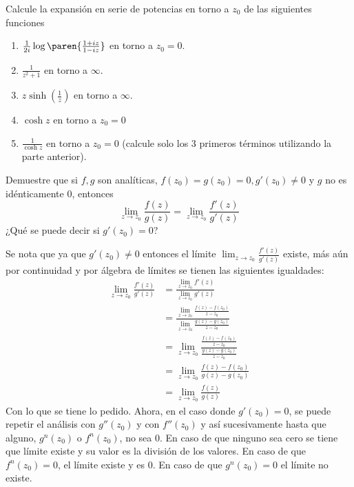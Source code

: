 \documentclass{homework}
\begin{document}
\begin{prob}
    Calcule la expansión en serie de potencias en torno a \(z_0\) de las siguientes funciones
    \begin{enumerate}
        \item \(\frac1{2i}\log\paren{\frac{1+iz}{1-iz}}\) en torno a \(z_0=0\).
        \item \(\frac1{z^2+1}\) en torno a \(\infty\).
        \item \(z\sinh(\frac1z)\) en torno a \(\infty\).
        \item \(\cosh z\) en torno a \(z_0=0\)
        \item \(\frac1{\cosh z}\) en torno a \(z_0=0\) (calcule solo los 3 primeros términos utilizando la parte anterior).
    \end{enumerate}
\end{prob}

\begin{sol}
    
\end{sol}

\begin{prob}
    Demuestre que si \(f,g\) son analíticas, \(f(z_0)=g(z_0)=0, g'(z_0)\neq0\) y \(g\) no es idénticamente 0, entonces
    \begin{equation*}
        \lim_{z\rightarrow z_0}\frac{f(z)}{g(z)}=\lim_{z\rightarrow z_0}\frac{f'(z)}{g'(z)}
    \end{equation*}
    ¿Qué se puede decir si \(g'(z_0)=0\)?
\end{prob}

\begin{sol}
    Se nota que ya que \(g'(z_0)\neq0\) entonces el límite \(\lim_{z\rightarrow z_0}\frac{f'(z)}{g'(z)}\) existe, más aún por continuidad y por álgebra de límites se tienen las siguientes igualdades:
    \begin{align*}
        \lim_{z\rightarrow z_0}\frac{f'(z)}{g'(z)}&=\frac{\lim_{z\rightarrow z_0}f'(z)}{\lim_{z\rightarrow z_0}g'(z)}\\
        &=\frac{\lim_{z\rightarrow z_0}\frac{f(z)-f(z_0)}{z-z_0}}{\lim_{z\rightarrow z_0}\frac{g(z)-g(z_0)}{z-z_0}}\\
        &=\lim_{z\rightarrow z_0}\frac{\frac{f(z)-f(z_0)}{z-z_0}}{\frac{g(z)-g(z_0)}{z-z_0}}\\
        &=\lim_{z\rightarrow z_0}\frac{f(z)-f(z_0)}{g(z)-g(z_0)}\\
        &=\lim_{z\rightarrow z_0}\frac{f(z)}{g(z)}
    \end{align*}
    Con lo que se tiene lo pedido. Ahora, en el caso donde \(g'(z_0)=0\), se puede repetir el análisis con \(g''(z_0)\) y con \(f''(z_0)\) y así sucesivamente hasta que alguno, \(g^n(z_0)\) o \(f^n(z_0)\), no sea 0. En caso de que ninguno sea cero se tiene que límite existe y su valor es la división de los valores. En caso de que \(f^n(z_0)=0\), el límite existe y es 0. En caso de que \(g^n(z_0)=0\) el límite no existe.
\end{sol}
\end{document}

